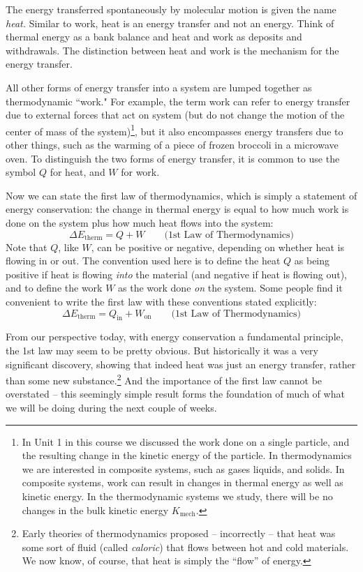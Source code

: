 The energy transferred spontaneously by molecular motion is given the
name {\it heat.}  Similar to work, heat is an energy transfer and not
an energy.  Think of thermal energy as a bank balance and heat and work
as deposits and withdrawals.  The distinction between heat and
work is the mechanism for the energy transfer.


\noindent All other forms of energy transfer into a system are lumped 
together as thermodynamic ``work."  For example, the term work can refer 
to energy transfer due to external forces that act on system (but do not 
change the motion of the center of mass of the system)\footnote{In Unit 1 
in this course we discussed the work done on a single particle,
and the resulting change in the kinetic energy of the particle.
In thermodynamics we are interested in composite systems, such as gases
liquids, and solids.  In composite systems, work can result in changes in
thermal energy as well as kinetic energy. In the thermodynamic systems
we study, there will be no changes in the bulk kinetic energy 
$K_\text{mech}$.}, but it also 
encompasses energy transfers due to other things, such as the warming of 
a piece of frozen broccoli in a microwave oven.  To distinguish the 
two forms of energy transfer, it is common to use the symbol $Q$ for heat, 
and $W$ for work.

Now we can state the first law of thermodynamics, which is simply a
statement of energy conservation: the change in thermal energy is
equal to how much work is done on the system plus how much heat flows
into the system:
\begin{equation}
\Delta E_\text{therm} = Q + W \qquad\text{(1st Law of Thermodynamics)}
\end{equation}
Note that $Q$, like $W$, can be positive or negative, depending on
whether heat is flowing in or out.  The convention used here is to
define the heat $Q$ as being positive if heat is flowing {\em into}
the material (and negative if heat is flowing out), and to define
the work $W$ as the work done {\em on} the system.  Some people find it
convenient to write the first law with these conventions stated
explicitly:
\begin{equation}
\Delta E_\text{therm} = Q_\text{in} + W_\text{on} \qquad\text{(1st Law of Thermodynamics)}
\label{eq:firstlaw}
\end{equation}

From our perspective today, with energy conservation a fundamental
principle, the 1st law may seem to be pretty obvious.  But historically it was a
very significant discovery, showing that indeed heat was just an
energy transfer, rather than some new substance.\footnote{Early theories of
thermodynamics proposed -- incorrectly -- that heat was some sort of
fluid (called {\em caloric}) that flows between hot and cold materials.
We now know, of course, that heat is simply the ``flow'' of energy.}
And the
importance of the first law cannot be overstated -- this seemingly simple
result forms the foundation of much of what we will be doing during
the next couple of weeks.

